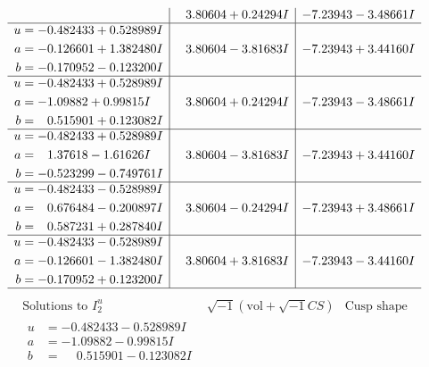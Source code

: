 \documentclass[1p]{elsarticle_modified}
\theoremstyle{definition}
\newcommand{\I}{\sqrt{-1}}
\begin{document}
$$\begin{array}{c|c|c}
 & \phantom{-}3.80604 + 0.24294 I & -7.23943 - 3.48661 I \\ \hline\begin{aligned}
u &= -0.482433 + 0.528989 I \\
a &= -0.126601 + 1.382480 I \\
b &= -0.170952 - 0.123200 I\end{aligned}
 & \phantom{-}3.80604 - 3.81683 I & -7.23943 + 3.44160 I \\ \hline\begin{aligned}
u &= -0.482433 + 0.528989 I \\
a &= -1.09882 + 0.99815 I \\
b &= \phantom{-}0.515901 + 0.123082 I\end{aligned}
 & \phantom{-}3.80604 + 0.24294 I & -7.23943 - 3.48661 I \\ \hline\begin{aligned}
u &= -0.482433 + 0.528989 I \\
a &= \phantom{-}1.37618 - 1.61626 I \\
b &= -0.523299 - 0.749761 I\end{aligned}
 & \phantom{-}3.80604 - 3.81683 I & -7.23943 + 3.44160 I \\ \hline\begin{aligned}
u &= -0.482433 - 0.528989 I \\
a &= \phantom{-}0.676484 - 0.200897 I \\
b &= \phantom{-}0.587231 + 0.287840 I\end{aligned}
 & \phantom{-}3.80604 - 0.24294 I & -7.23943 + 3.48661 I \\ \hline\begin{aligned}
u &= -0.482433 - 0.528989 I \\
a &= -0.126601 - 1.382480 I \\
b &= -0.170952 + 0.123200 I\end{aligned}
 & \phantom{-}3.80604 + 3.81683 I & -7.23943 - 3.44160 I\\
 \hline 
 \end{array}$$\newpage$$\begin{array}{c|c|c}  
\text{Solutions to }I^u_{2}& \I (\text{vol} + \sqrt{-1}CS) & \text{Cusp shape}\\
 \hline 
\begin{aligned}
u &= -0.482433 - 0.528989 I \\
a &= -1.09882 - 0.99815 I \\
b &= \phantom{-}0.515901 - 0.123082 I\end{aligned}

\end{array}$$
\end{document}
